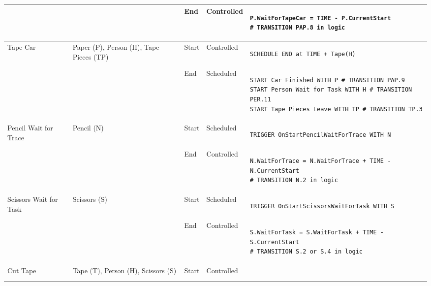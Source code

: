 \begin{longtable}{@{}>{\raggedright\arraybackslash}p{1.8cm}>{\raggedright\arraybackslash}p{2.1cm}>{\raggedright\arraybackslash}p{0.9cm}>{\raggedright\arraybackslash}p{2.2cm}>{\raggedright\arraybackslash}p{8.75cm}@{}}
  &                                                          & End   & Controlled & 
\begin{lstlisting}[language=CMPseudo]
P.WaitForTapeCar = TIME - P.CurrentStart
# TRANSITION PAP.8 in logic
\end{lstlisting}             \\ \midrule
  Tape Car                  & Paper (P), Person (H), Tape Pieces (TP) & Start & Controlled  & 
\begin{lstlisting}[language=CMPseudo]
SCHEDULE END at TIME + Tape(H)
\end{lstlisting}             \\
  &                                                          & End   & Scheduled &
\begin{lstlisting}[language=CMPseudo]
START Car Finished WITH P # TRANSITION PAP.9
START Person Wait for Task WITH H # TRANSITION PER.11
START Tape Pieces Leave WITH TP # TRANSITION TP.3
\end{lstlisting}              \\ \midrule
  Pencil Wait for Trace    & Pencil (N)                             & Start & Scheduled  & 
\begin{lstlisting}[language=CMPseudo]
TRIGGER OnStartPencilWaitForTrace WITH N
\end{lstlisting}             \\
  &                                                          & End   & Controlled & 
\begin{lstlisting}[language=CMPseudo]
N.WaitForTrace = N.WaitForTrace + TIME - N.CurrentStart
# TRANSITION N.2 in logic
\end{lstlisting}             \\ \midrule
  Scissors Wait for Task    & Scissors (S)                            & Start & Scheduled  & 
\begin{lstlisting}[language=CMPseudo]
TRIGGER OnStartScissorsWaitForTask WITH S
\end{lstlisting}             \\
  &                                                          & End   & Controlled & 
\begin{lstlisting}[language=CMPseudo]
S.WaitForTask = S.WaitForTask + TIME - S.CurrentStart
# TRANSITION S.2 or S.4 in logic
\end{lstlisting}             \\ \midrule
  Cut Tape                  & Tape (T), Person (H), Scissors (S)      & Start & Controlled  & 
\begin{lstlisting}[language=CMPseudo]

\end{lstlisting}
\end{longtable}
